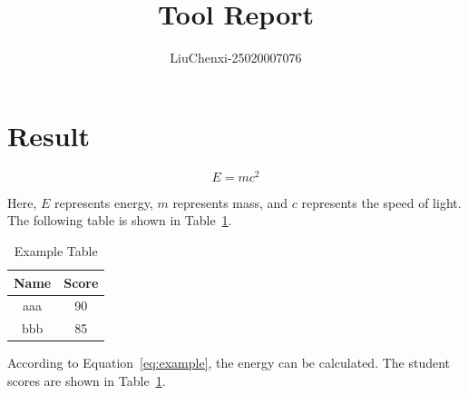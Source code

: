\documentclass{article}
\begin{document}
\title{Tool Report}
\author{LiuChenxi-25020007076}
\maketitle
\section{Result}
\begin{equation}
E = mc^2
\label{eq:example}
\end{equation}

Here, $E$ represents energy, $m$ represents mass, and $c$ represents the speed of light.
The following table is shown in Table~\ref{tab:example}.

\begin{table}[htbp]
    \centering
    \caption{Example Table}
    \label{tab:example}
    \begin{tabular}{cc}
        \hline
        Name & Score \\
        \hline
        aaa & 90 \\
        bbb & 85 \\
        \hline
    \end{tabular}
\end{table}

According to Equation~\ref{eq:example}, the energy can be calculated. The student scores are shown in Table~\ref{tab:example}.
\end{document}
